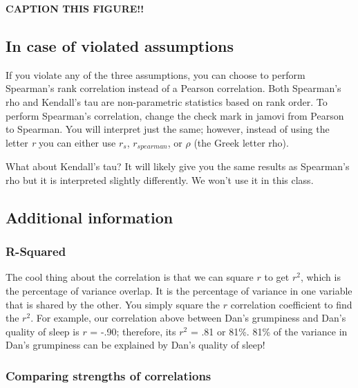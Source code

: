 \documentclass[
]{book}
\begin{document}
\label{fig:unnamed-chunk-1}\textbf{CAPTION THIS FIGURE!!}

\hypertarget{in-case-of-violated-assumptions-7}{%
\subsection{In case of violated assumptions}\label{in-case-of-violated-assumptions-7}}

If you violate any of the three assumptions, you can choose to perform Spearman's rank correlation instead of a Pearson correlation. Both Spearman's rho and Kendall's tau are non-parametric statistics based on rank order. To perform Spearman's correlation, change the check mark in jamovi from Pearson to Spearman. You will interpret just the same; however, instead of using the letter \emph{r} you can either use \(r_s\), \(r_{spearman}\), or \(\rho\) (the Greek letter rho).

What about Kendall's tau? It will likely give you the same results as Spearman's rho but it is interpreted slightly differently. We won't use it in this class.

\hypertarget{additional-information-4}{%
\subsection{Additional information}\label{additional-information-4}}

\hypertarget{r-squared}{%
\subsubsection{R-Squared}\label{r-squared}}

The cool thing about the correlation is that we can square \(r\) to get \(r^2\), which is the percentage of variance overlap. It is the percentage of variance in one variable that is shared by the other. You simply square the \(r\) correlation coefficient to find the \(r^2\). For example, our correlation above between Dan's grumpiness and Dan's quality of sleep is \(r\) = -.90; therefore, its \(r^2\) = .81 or 81\%. 81\% of the variance in Dan's grumpiness can be explained by Dan's quality of sleep!

\hypertarget{comparing-strengths-of-correlations}{%
\subsubsection{Comparing strengths of correlations}\label{comparing-strengths-of-correlations}}
\end{document}
